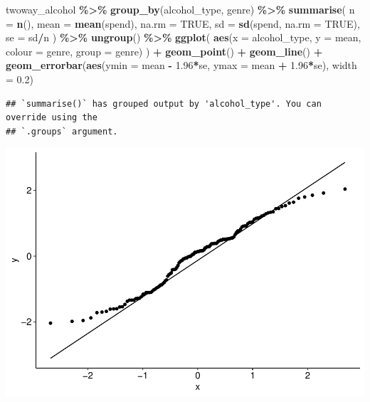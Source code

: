 \documentclass[
]{book}
\newenvironment{Shaded}{\begin{snugshade}}{\end{snugshade}}
\newcommand{\AttributeTok}[1]{\textcolor[rgb]{0.13,0.29,0.53}{#1}}
\newcommand{\ConstantTok}[1]{\textcolor[rgb]{0.56,0.35,0.01}{#1}}
\newcommand{\FloatTok}[1]{\textcolor[rgb]{0.00,0.00,0.81}{#1}}
\newcommand{\FunctionTok}[1]{\textcolor[rgb]{0.13,0.29,0.53}{\textbf{#1}}}
\newcommand{\NormalTok}[1]{#1}
\newcommand{\SpecialCharTok}[1]{\textcolor[rgb]{0.81,0.36,0.00}{\textbf{#1}}}
\begin{document}
\begin{Shaded}
\begin{Highlighting}[]
\NormalTok{twoway\_alcohol }\SpecialCharTok{\%\textgreater{}\%}
  \FunctionTok{group\_by}\NormalTok{(alcohol\_type, genre) }\SpecialCharTok{\%\textgreater{}\%}
  \FunctionTok{summarise}\NormalTok{(}
    \AttributeTok{n =} \FunctionTok{n}\NormalTok{(),}
    \AttributeTok{mean =} \FunctionTok{mean}\NormalTok{(spend), }\AttributeTok{na.rm =} \ConstantTok{TRUE}\NormalTok{,}
    \AttributeTok{sd =} \FunctionTok{sd}\NormalTok{(spend, }\AttributeTok{na.rm =} \ConstantTok{TRUE}\NormalTok{),}
    \AttributeTok{se =}\NormalTok{ sd}\SpecialCharTok{/}\NormalTok{n}
\NormalTok{  ) }\SpecialCharTok{\%\textgreater{}\%}
  \FunctionTok{ungroup}\NormalTok{() }\SpecialCharTok{\%\textgreater{}\%}
  \FunctionTok{ggplot}\NormalTok{(}
    \FunctionTok{aes}\NormalTok{(}\AttributeTok{x =}\NormalTok{ alcohol\_type, }\AttributeTok{y =}\NormalTok{ mean, }\AttributeTok{colour =}\NormalTok{ genre, }\AttributeTok{group =}\NormalTok{ genre)}
\NormalTok{  ) }\SpecialCharTok{+}
  \FunctionTok{geom\_point}\NormalTok{() }\SpecialCharTok{+}
  \FunctionTok{geom\_line}\NormalTok{() }\SpecialCharTok{+}
  \FunctionTok{geom\_errorbar}\NormalTok{(}\FunctionTok{aes}\NormalTok{(}\AttributeTok{ymin =}\NormalTok{ mean }\SpecialCharTok{{-}} \FloatTok{1.96}\SpecialCharTok{*}\NormalTok{se, }\AttributeTok{ymax =}\NormalTok{ mean }\SpecialCharTok{+} \FloatTok{1.96}\SpecialCharTok{*}\NormalTok{se), }\AttributeTok{width =} \FloatTok{0.2}\NormalTok{)}
\end{Highlighting}
\end{Shaded}

\begin{verbatim}
## `summarise()` has grouped output by 'alcohol_type'. You can override using the
## `.groups` argument.
\end{verbatim}

\includegraphics{_main_files/figure-latex/unnamed-chunk-243-1.pdf}
\end{document}
